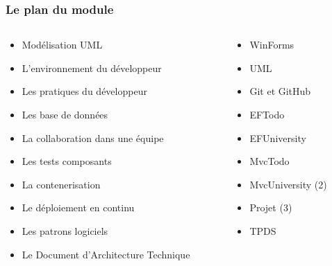 \begin{frame}
    \frametitle{Le plan du module}

    \begin{columns}
        \begin{column}{0.6\textwidth}
            \begin{itemize}
                \item Modélisation UML
                \item L'environnement du développeur
                \item Les pratiques du développeur
                \item Les base de données
                \item La collaboration dans une équipe
                \item Les tests composants
                \item La contenerisation
                \item Le déploiement en continu
                \item Les patrons logiciels
                \item Le Document d'Architecture Technique
            \end{itemize}
        \end{column}

        \begin{column}{0.4\textwidth}
            \begin{itemize}
                \item WinForms
                \item UML
                \item Git et GitHub
                \item EFTodo
                \item EFUniversity
                \item MvcTodo
                \item MvcUniversity (2)
                \item Projet (3)
                \item TPDS
            \end{itemize}
        \end{column}
    \end{columns}
\end{frame}

